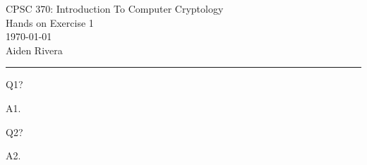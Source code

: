 \documentclass[12pt, letterpaper, onecolumn]{exam}
\begin{document}
\nopointsinmargin
\pointformat{}

\begingroup
\centering
\LARGE CPSC 370: Introduction To Computer Cryptology\\[0.5em]
\LARGE Hands on Exercise 1\\[0.5em]
\large \today\\[0.5em]
\large Aiden Rivera\par
\endgroup

\rule{\textwidth}{0.4pt}

\printanswers
\renewcommand{\solutiontitle}{\noindent\textbf{Ans:}\enspace}

\begin{questions}
\question[0] Q1?

\begin{solution}
A1.
\end{solution}

\question[0] Q2?

\begin{solution}
A2.
\end{solution}

\end{questions}
\end{document}
